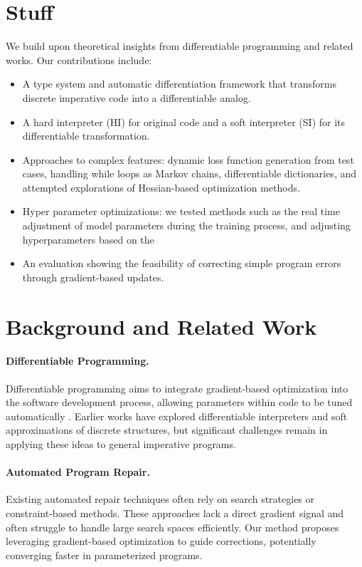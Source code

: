 \documentclass{article}
\begin{document}
\section*{Stuff}
We build upon theoretical insights from differentiable programming \cite{blondel2024elementsdifferentiableprogramming, DBLP:journals/corr/abs-1907-07587, vandemeulebroucke2018myia} and related works. Our contributions include:
\begin{itemize}
\item A type system and automatic differentiation framework that transforms discrete imperative code into a differentiable analog.
\item A hard interpreter (HI) for original code and a soft interpreter (SI) for its differentiable transformation.
\item Approaches to complex features: dynamic loss function generation from test cases, handling while loops as Markov chains, differentiable dictionaries, and attempted explorations of Hessian-based optimization methods.
\item Hyper parameter optimizations: we tested methods such as the real time adjustment of model parameters during the training process, and adjusting hyperparameters based on the 
\item An evaluation showing the feasibility of correcting simple program errors through gradient-based updates.
\end{itemize}

\section{Background and Related Work}
\paragraph{Differentiable Programming.} Differentiable programming aims to integrate gradient-based optimization into the software development process, allowing parameters within code to be tuned automatically \cite{blondel2024elementsdifferentiableprogramming,DBLP:journals/corr/abs-1907-07587,vandemeulebroucke2018myia}. Earlier works have explored differentiable interpreters and soft approximations of discrete structures, but significant challenges remain in applying these ideas to general imperative programs.

\paragraph{Automated Program Repair.} Existing automated repair techniques often rely on search strategies or constraint-based methods. These approaches lack a direct gradient signal and often struggle to handle large search spaces efficiently. Our method proposes leveraging gradient-based optimization to guide corrections, potentially converging faster in parameterized programs.
\end{document}
